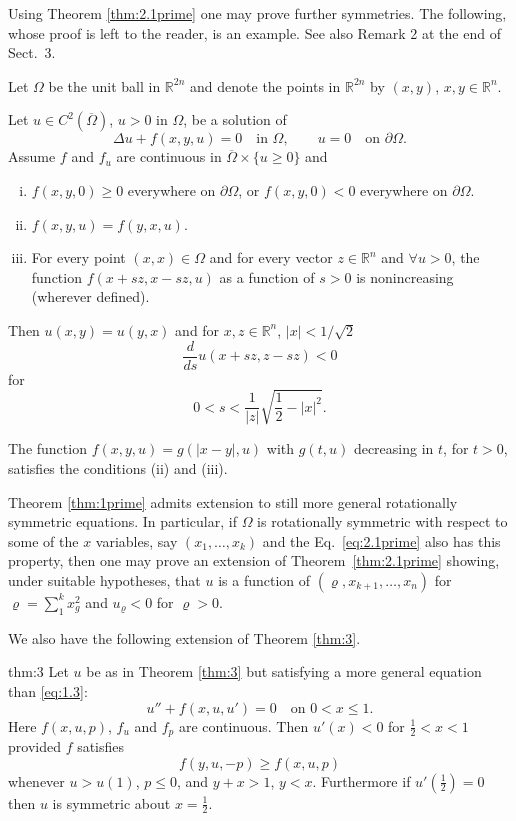 Using Theorem \ref{thm:2.1prime} one may prove further symmetries.
The following, whose proof is left to the reader, is an example.
See also Remark 2 at the end of Sect.~3.

Let $\Omega$ be the unit ball in $\mathbb{R}^{2n}$ and denote the points in $\mathbb{R}^{2n}$
by $(x,y)$, $x,y\in \mathbb{R}^n$.

\begin{corollary}\label{cor:2}
  Let $u\in C^2(\overline{\Omega})$, $u>0$ in $\Omega$, be a solution of
  \[\Delta u + f(x,y,u) = 0\quad\text{in } \Omega,\qquad u = 0\quad\text{on } \partial\Omega.\]
  Assume $f$ and $f_u$ are continuous in $\overline{\Omega}\times\{u\geq 0\}$ and
  \begin{enumerate}[(i)]
    \item $f(x,y,0) \geq 0$ everywhere on $\partial\Omega$,
      or $f(x,y,0)<0$ everywhere on $\partial\Omega$.
    \item $f(x,y,u) = f(y,x,u)$.
    \item For every point $(x,x)\in\Omega$ and for every vector $z\in \mathbb{R}^n$
      and $\forall u>0$, the function $f(x+sz, x-sz, u)$ as a function of $s>0$
      is nonincreasing (wherever defined).
  \end{enumerate}
  Then $u(x,y) = u(y,x)$ and for $x, z\in \mathbb{R}^n$, $|x|<1/\sqrt{2}$
  \[\frac{d}{ds} u(x+sz, z-sz) < 0\]
  for
  \[0 < s < \frac{1}{|z|}\sqrt{\frac12 - |x|^2}.\]
\end{corollary}

The function $f(x, y, u) = g(|x-y|, u)$ with $g(t, u)$ decreasing in $t$,
for $t>0$, satisfies the conditions (ii) and (iii).

Theorem \ref{thm:1prime} admits extension to still more general rotationally symmetric equations. 
In particular, if $\Omega$ is rotationally symmetric with respect to some of the $x$ variables, 
say $(x_1,\ldots,x_k)$ and the Eq.~\eqref{eq:2.1prime} also has this property,
then one may prove an extension of Theorem~\ref{thm:2.1prime} showing,
under suitable hypotheses, that $u$ is a function of $(\varrho, x_{k+1}, \ldots, x_n)$
for $\varrho = \sum_1^k x_g^2$ and $u_{\varrho}<0$ for $\varrho>0$.

 We also have the following extension of Theorem \ref{thm:3}.

\begin{theoremp}{thm:3}\label{thm:3prime}
  Let $u$ be as in Theorem \ref{thm:3} but satisfying a more general equation
  than \eqref{eq:1.3}:
  \[u'' + f(x,u,u') = 0\quad\text{on } 0<x\leq 1.\]
  Here $f(x,u,p)$, $f_u$ and $f_p$ are continuous.
  Then $u'(x)<0$ for $\frac12 < x < 1$ provided $f$ satisfies
  \begin{equation}\label{eq:2.6prime}
    f(y,u,-p) \geq f(x,u,p) \tag{$2.6'$}
  \end{equation}
  whenever $u>u(1)$, $p\leq 0$, and $y+x>1$, $y<x$.
  Furthermore if $u'(\frac12) = 0$ then $u$ is symmetric about $x = \frac12$.
\end{theoremp}

